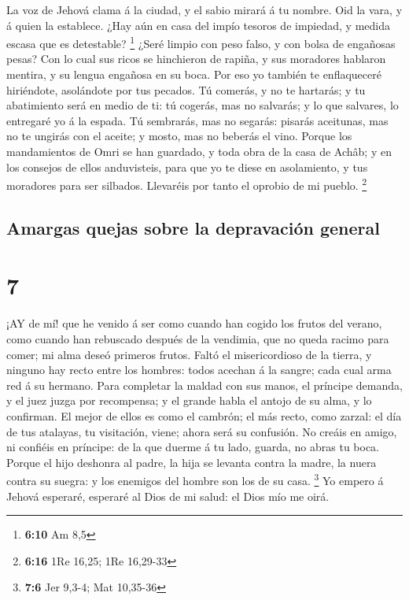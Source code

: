  La voz de Jehová clama á la ciudad, y el sabio mirará á tu
nombre. Oid la vara, y á quien la establece.  ¿Hay aún en
casa del impío tesoros de impiedad, y medida escasa que es detestable?
\footnote{\textbf{6:10} Am 8,5}  ¿Seré limpio con peso
falso, y con bolsa de engañosas pesas?  Con lo cual sus
ricos se hinchieron de rapiña, y sus moradores hablaron mentira, y su
lengua engañosa en su boca.  Por eso yo también te
enflaqueceré hiriéndote, asolándote por tus pecados.  Tú
comerás, y no te hartarás; y tu abatimiento será en medio de ti: tú
cogerás, mas no salvarás; y lo que salvares, lo entregaré yo á la
espada.  Tú sembrarás, mas no segarás: pisarás aceitunas,
mas no te ungirás con el aceite; y mosto, mas no beberás el vino.
 Porque los mandamientos de Omri se han guardado, y toda
obra de la casa de Achâb; y en los consejos de ellos anduvisteis, para
que yo te diese en asolamiento, y tus moradores para ser silbados.
Llevaréis por tanto el oprobio de mi pueblo. \footnote{\textbf{6:16} 1Re
  16,25; 1Re 16,29-33}

\hypertarget{amargas-quejas-sobre-la-depravaciuxf3n-general}{%
\subsection{Amargas quejas sobre la depravación
general}\label{amargas-quejas-sobre-la-depravaciuxf3n-general}}

\hypertarget{section-6}{%
\section{7}\label{section-6}}

 ¡AY de mí! que he venido á ser como cuando han cogido los
frutos del verano, como cuando han rebuscado después de la vendimia, que
no queda racimo para comer; mi alma deseó primeros frutos. 
Faltó el misericordioso de la tierra, y ninguno hay recto entre los
hombres: todos acechan á la sangre; cada cual arma red á su hermano.
 Para completar la maldad con sus manos, el príncipe
demanda, y el juez juzga por recompensa; y el grande habla el antojo de
su alma, y lo confirman.  El mejor de ellos es como el
cambrón; el más recto, como zarzal: el día de tus atalayas, tu
visitación, viene; ahora será su confusión.  No creáis en
amigo, ni confiéis en príncipe: de la que duerme á tu lado, guarda, no
abras tu boca.  Porque el hijo deshonra al padre, la hija se
levanta contra la madre, la nuera contra su suegra: y los enemigos del
hombre son los de su casa. \footnote{\textbf{7:6} Jer 9,3-4; Mat
  10,35-36}  Yo empero á Jehová esperaré, esperaré al Dios
de mi salud: el Dios mío me oirá.

